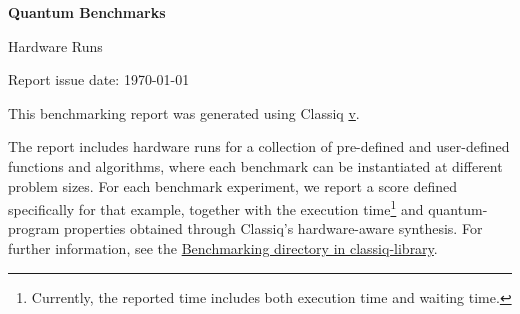 \documentclass[a4paper]{article}
\begin{document}
\color{ThemeText}

\begin{center}
  {\LARGE\bfseries Quantum Benchmarks\par}
  \vspace{0.3em}
  {\large Hardware Runs\par}
  \vspace{0.4em}
  {\normalsize Report issue date: \today\par}
\end{center}

\vspace{1em}



This benchmarking report was generated using Classiq \href{https://platform.classiq.io/}{v\classiqversion}.
\medskip

The report includes hardware runs for a collection of pre-defined and user-defined functions and algorithms,
where each benchmark can be instantiated at different problem sizes. For each benchmark experiment,
we report a score defined specifically for that example,
together with the execution time\footnote{Currently, the reported time includes both execution time and waiting time.}
and quantum-program properties obtained through Classiq's hardware-aware synthesis.
For further information, see the \href{https://github.com/Classiq/classiq-library/tree/main/benchmarking}{Benchmarking directory in classiq-library}.

\bigskip

\end{document}
